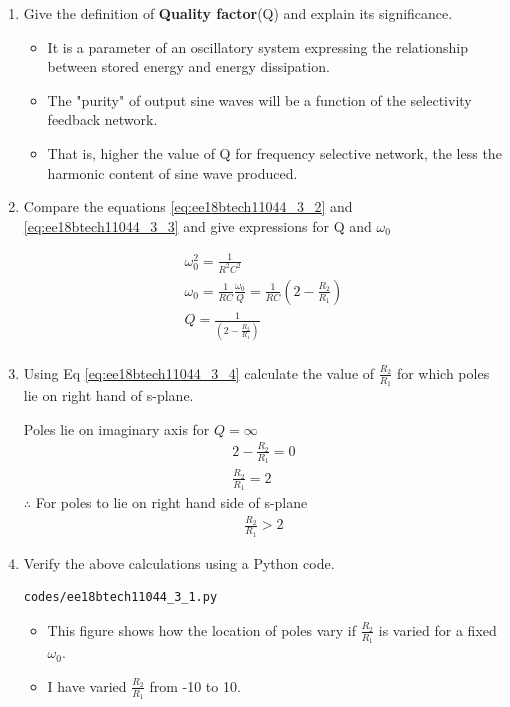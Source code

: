 \begin{enumerate}[label=\thesubsection.\arabic*.,ref=\thesubsection.\theenumi]
\item Give the definition of \textbf{Quality factor}(Q) and explain its significance.

\solution
\begin{itemize}
    \item It is a parameter of an oscillatory system expressing the relationship between stored energy and energy dissipation.
    \item The "purity" of output sine waves will be a function of the selectivity feedback network.
    \item That is, higher the value of Q for frequency selective network, the less the harmonic content of sine wave produced.
\end{itemize}
 


\item 
Compare the equations \ref{eq:ee18btech11044_3_2} and \ref{eq:ee18btech11044_3_3} and give expressions for Q and $\omega_0$

\solution
\begin{align}
    \omega_0^2 = \frac{1}{R^2C^2} \\
    \omega_0 = \frac{1}{RC}
    \frac{\omega_0}{Q} = \frac{1}{RC}(2 - \frac{R_2}{R_1}) \\
    Q = \frac{1}{(2 - \frac{R_2}{R_1})} \label{eq:ee18btech11044_3_4} \\
\end{align}
\item 
Using Eq \ref{eq:ee18btech11044_3_4} calculate the value of $\frac{R_2}{R_1}$ for which poles lie on right hand of s-plane.

\solution 

Poles lie on imaginary axis for $Q = \infty$
\begin{align}
    2 - \frac{R_2}{R_1} = 0 \\
    \frac{R_2}{R_1} = 2
\end{align}
$\therefore$ For poles to lie on right hand side of s-plane
\begin{align}
    \frac{R_2}{R_1} >2
\end{align}


\item
Verify the above calculations using a Python code.

\solution
\begin{lstlisting}
codes/ee18btech11044_3_1.py
\end{lstlisting}
\begin{itemize}
    \item This figure shows how the location of poles vary if $\frac{R_2}{R_1}$ is varied for a fixed $\omega_0$.
    \item I have varied $\frac{R_2}{R_1}$ from -10 to 10. 
\end{itemize}


\end{enumerate}
